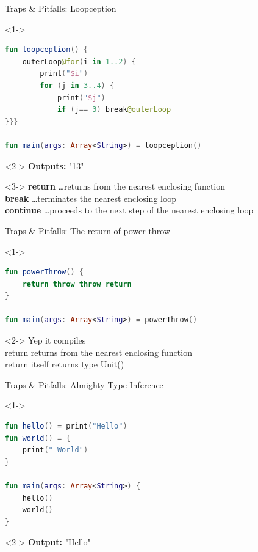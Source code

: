 \begin{frame}[fragile]{Traps \& Pitfalls: Loopception}
\begin{onlyenv}<1->
	\begin{lstlisting}[language=Kotlin]
fun loopception() {
	outerLoop@for(i in 1..2) {
		print("$i")
		for (j in 3..4) {
			print("$j")
			if (j== 3) break@outerLoop
}}}

fun main(args: Array<String>) = loopception()
	\end{lstlisting}
	\end{onlyenv}
	\begin{onlyenv}<2->
		\textbf{Outputs:} "13"\\\vspace{\baselineskip}
	\end{onlyenv}
	\begin{onlyenv}<3->
		\textbf{return} \dots returns from the nearest enclosing function\\
		\textbf{break} \dots terminates the nearest enclosing loop\\
		\textbf{continue} \dots proceeds to the next step of the nearest enclosing loop
	\end{onlyenv}
\end{frame}


\begin{frame}[fragile]{Traps \& Pitfalls: The return of power throw}
	\begin{onlyenv}<1->
		\begin{lstlisting}[language=Kotlin]
fun powerThrow() {
	return throw throw return
}

fun main(args: Array<String>) = powerThrow()
		\end{lstlisting}
	\end{onlyenv}
	\begin{onlyenv}<2->
		Yep it compiles\\
		return returns from the nearest enclosing function\\
		return itself returns type Unit()
	\end{onlyenv}
\end{frame}

\begin{frame}[fragile]{Traps \& Pitfalls: Almighty Type Inference}
	\begin{onlyenv}<1->
		\begin{lstlisting}[language=Kotlin]
fun hello() = print("Hello")
fun world() = {
	print(" World")
}

fun main(args: Array<String>) {
	hello()
	world()
}	
		\end{lstlisting}
	\end{onlyenv}
	\begin{onlyenv}<2->
		\textbf{Output:} "Hello"
	\end{onlyenv}
\end{frame}

